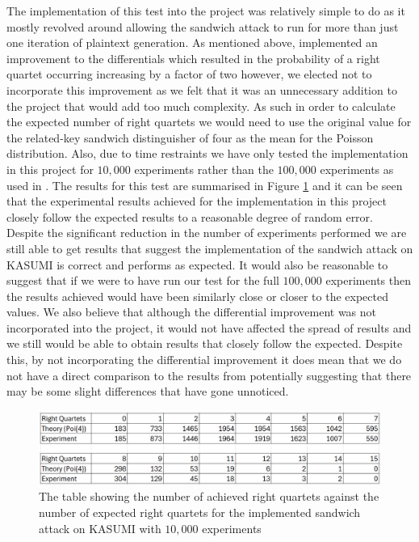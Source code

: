 \documentclass[10pt,journal,compsoc]{IEEEtran}
\begin{document}
The implementation of this test into the project was relatively simple to do as it mostly revolved around allowing the sandwich attack to run for more than just one iteration of plaintext generation. As mentioned above, \cite{jofc-1994-14102} implemented an improvement to the differentials which resulted in the probability of a right quartet occurring increasing by a factor of two however, we elected not to incorporate this improvement as we felt that it was an unnecessary addition to the project that would add too much complexity. As such in order to calculate the expected number of right quartets we would need to use the original value for the related-key sandwich distinguisher of four as the mean for the Poisson distribution. Also, due to time restraints we have only tested the implementation in this project for \(10,000\) experiments rather than the \(100,000\) experiments as used in \cite{jofc-2014-25962}. The results for this test are summarised in Figure \ref{fig:versand} and it can be seen that the experimental results achieved for the implementation in this project closely follow the expected results to a reasonable degree of random error. Despite the significant reduction in the number of experiments performed we are still able to get results that suggest the implementation of the sandwich attack on KASUMI is correct and performs as expected. It would also be reasonable to suggest that if we were to have run our test for the full \(100,000\) experiments then the results achieved would have been similarly close or closer to the expected values. We also believe that although the differential improvement was not incorporated into the project, it would not have affected the spread of results and we still would be able to obtain results that closely follow the expected. Despite this, by not incorporating the differential improvement it does mean that we do not have a direct comparison to the results from \cite{jofc-1994-14102} potentially suggesting that there may be some slight differences that have gone unnoticed. 

\begin{figure}[hbt!]
    \centering
    \includegraphics[width=1\linewidth]{Figures/verSandTable.png}
    \caption{The table showing the number of achieved right quartets against the number of expected right quartets for the implemented sandwich attack on KASUMI with \(10,000\) experiments}
    \label{fig:versand}
\end{figure}
\end{document}
